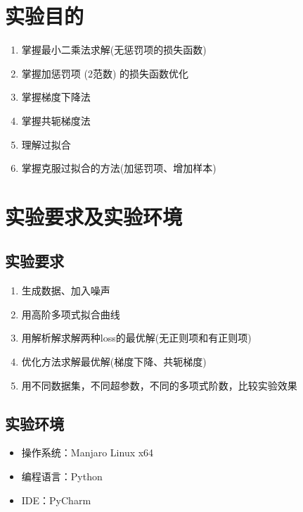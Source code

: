 \documentclass{ML}
\begin{document}
\maketitle

\tableofcontents
\newpage

\section{实验目的}

\begin{enumerate}
	\item 掌握最小二乘法求解(无惩罚项的损失函数)
	\item 掌握加惩罚项 (2范数) 的损失函数优化
	\item 掌握梯度下降法
	\item 掌握共轭梯度法
	\item 理解过拟合
	\item 掌握克服过拟合的方法(加惩罚项、增加样本)
\end{enumerate}

\section{实验要求及实验环境}

\subsection{实验要求}

\begin{enumerate}
	\item 生成数据、加入噪声
	\item 用高阶多项式拟合曲线
	\item 用解析解求解两种loss的最优解(无正则项和有正则项)
	\item 优化方法求解最优解(梯度下降、共轭梯度)
	\item 用不同数据集，不同超参数，不同的多项式阶数，比较实验效果
\end{enumerate}

\subsection{实验环境}

\begin{itemize}
	\item 操作系统：Manjaro Linux x64
	\item 编程语言：Python
	\item IDE：PyCharm
\end{itemize}
\end{document}
